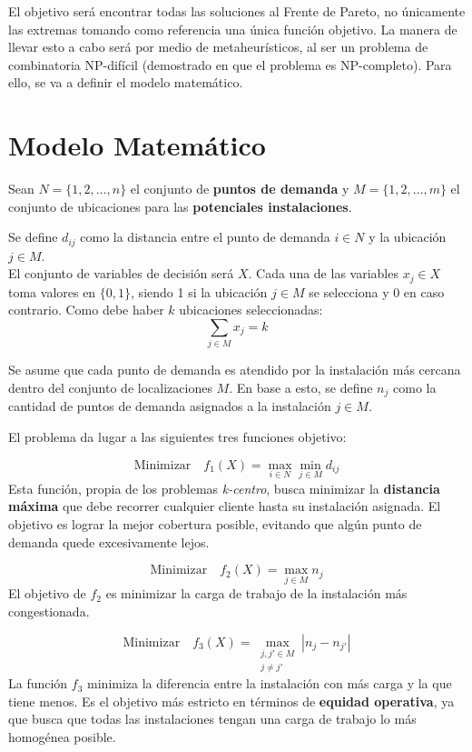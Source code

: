 \documentclass[12pt,a4paper]{book}
\begin{document}
El objetivo será encontrar todas las soluciones al Frente de Pareto, no únicamente las extremas tomando como referencia una única
función objetivo. La manera de llevar esto a cabo será por medio de metaheurísticos, al ser un problema de combinatoria NP-difícil (demostrado en \cite{k-balanced_1} que el problema es NP-completo). Para ello, 
se va a definir el modelo matemático.

\section{Modelo Matemático}
Sean $N=\{1, 2, \dots, n\}$ el conjunto de \textbf{puntos de demanda} y $M=\{1, 2, \dots, m\}$ el conjunto de ubicaciones para las \textbf{potenciales instalaciones}.

Se define $d_{ij}$ como la distancia entre el punto de demanda $i \in N$ y la ubicación $j \in M$.\\
El conjunto de variables de decisión será $X$. Cada una de las variables $x_j \in X$ toma valores en $\{0,1\}$, siendo 1 si la ubicación $j \in M$ se selecciona y 0 en caso contrario. Como debe haber $k$ ubicaciones seleccionadas:
\begin{equation}
    \sum_{j \in M} x_j = k
\end{equation}

Se asume que cada punto de demanda es atendido por la instalación más cercana dentro del conjunto de localizaciones $M$. En base a esto, se define $n_j$ como la cantidad de puntos de demanda asignados a la instalación $j \in M$.

El problema da lugar a las siguientes tres funciones objetivo:

\begin{equation}
    \text{Minimizar} \quad f_1(X) = \max_{i \in N} \min_{j \in M} d_{ij}
    \label{eq:f1}
\end{equation}
Esta función, propia de los problemas \textit{k-centro}, busca minimizar la \textbf{distancia máxima} que debe recorrer cualquier cliente hasta su instalación asignada. El objetivo es lograr la mejor cobertura posible, evitando que algún punto de demanda quede excesivamente lejos.

\begin{equation}
    \text{Minimizar} \quad f_2(X) = \max_{j \in M} n_j
    \label{eq:f2}
\end{equation}
El objetivo de $f_2$ es minimizar la carga de trabajo de la instalación más congestionada. 

\begin{equation}
    \text{Minimizar} \quad f_3(X) = \max_{\substack{j, j' \in M \\ j \neq j'}} |n_j - n_{j'}|
    \label{eq:f3}
\end{equation}
La función $f_3$ minimiza la diferencia entre la instalación con más carga y la que tiene menos. Es el objetivo más estricto en términos de \textbf{equidad operativa}, ya que busca que todas las instalaciones tengan una carga de trabajo lo más homogénea posible.
\end{document}
